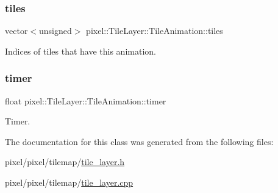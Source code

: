 \subsubsection{\texorpdfstring{tiles}{tiles}}
{\footnotesize\ttfamily vector$<$unsigned$>$ pixel\+::\+Tile\+Layer\+::\+Tile\+Animation\+::tiles}



Indices of tiles that have this animation. 

\mbox{\label{classpixel_1_1_tile_layer_1_1_tile_animation_ab90e96c9b709cc00481bf292df529635}} 
\subsubsection{\texorpdfstring{timer}{timer}}
{\footnotesize\ttfamily float pixel\+::\+Tile\+Layer\+::\+Tile\+Animation\+::timer}



Timer. 



The documentation for this class was generated from the following files\+:\begin{DoxyCompactItemize}
\item 
pixel/pixel/tilemap/\hyperlink{tile__layer_8h}{tile\+\_\+layer.\+h}\item 
pixel/pixel/tilemap/\hyperlink{tile__layer_8cpp}{tile\+\_\+layer.\+cpp}\end{DoxyCompactItemize}
